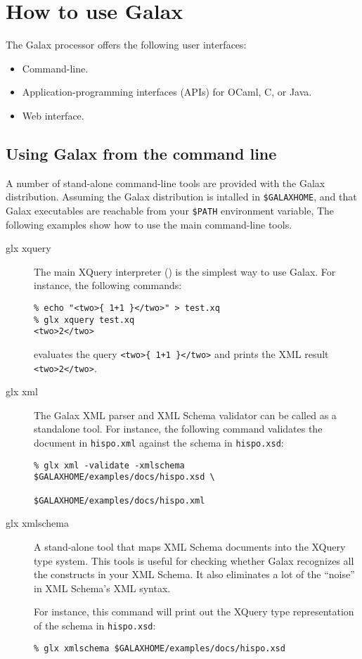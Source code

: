 \section{How to use Galax}

The Galax processor offers the following user interfaces:

\begin{itemize}
\item Command-line.
\item Application-programming interfaces (APIs) for OCaml, C, or Java.
\item Web interface.
\end{itemize}

\subsection{Using Galax from the command line}

A number of stand-alone command-line tools are provided with the Galax
distribution. Assuming the Galax distribution is intalled in
\verb+$GALAXHOME+, and that Galax executables are reachable from your
\verb+$PATH+ environment variable, The following examples show how to
use the main command-line tools.

\begin{description}
\item[glx xquery] The main XQuery interpreter () is
  the simplest way to use Galax. For instance, the following commands:
\begin{verbatim}
% echo "<two>{ 1+1 }</two>" > test.xq
% glx xquery test.xq
<two>2</two>
\end{verbatim}
evaluates the query \verb|<two>{ 1+1 }</two>| and prints the XML
result \verb|<two>2</two>|.

\item[glx xml] The Galax XML parser and XML Schema validator can be
  called as a standalone tool. For instance, the following command
  validates the document in \texttt{hispo.xml} against the schema in
  \texttt{hispo.xsd}:
\begin{verbatim}
% glx xml -validate -xmlschema $GALAXHOME/examples/docs/hispo.xsd \
                               $GALAXHOME/examples/docs/hispo.xml 
\end{verbatim}

\item[glx xmlschema] A stand-alone tool that maps XML Schema documents into the XQuery
  type system.   This tools is useful for checking whether Galax
  recognizes all the constructs in your XML Schema.  It also eliminates a lot of the
  ``noise'' in XML Schema's XML syntax. 

For instance, this command will print out the XQuery type
representation of the schema in \texttt{hispo.xsd}: 
\begin{verbatim}
% glx xmlschema $GALAXHOME/examples/docs/hispo.xsd 
\end{verbatim}
\end{description}

